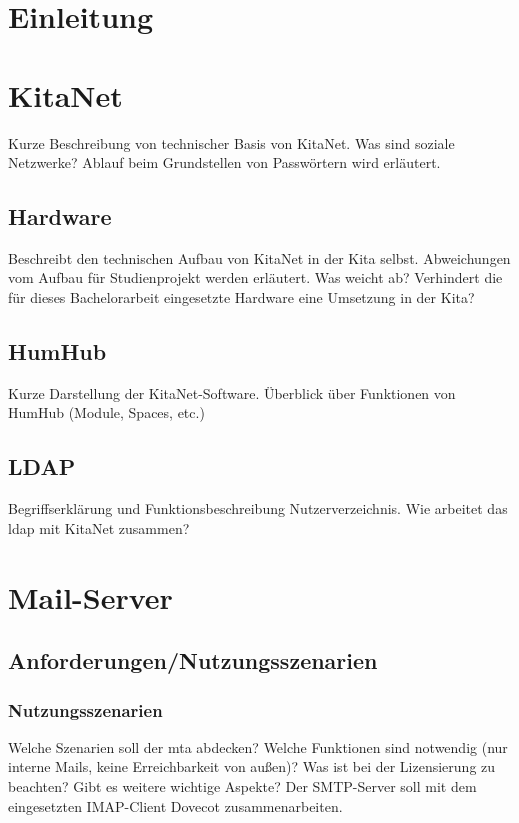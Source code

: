 

\chapter{Einleitung}
\label{sec:Einleitung}

\blindtext


\chapter{KitaNet}

Kurze Beschreibung von technischer Basis von KitaNet. Was sind soziale Netzwerke?
Ablauf beim Grundstellen von Passwörtern wird erläutert.

\section{Hardware}
Beschreibt den technischen Aufbau von KitaNet in der Kita selbst.
Abweichungen vom Aufbau für Studienprojekt werden erläutert. Was weicht ab?
Verhindert die für dieses Bachelorarbeit eingesetzte Hardware eine Umsetzung in der Kita?

\section{HumHub}
Kurze Darstellung der KitaNet-Software. Überblick über Funktionen von HumHub (Module, Spaces, etc.)

\section{LDAP}
Begriffserklärung und Funktionsbeschreibung Nutzerverzeichnis. 
Wie arbeitet das \ac{ldap} mit KitaNet zusammen?

\chapter{Mail-Server}

\section{Anforderungen/Nutzungsszenarien}
\subsection{Nutzungsszenarien}
Welche Szenarien soll der \ac{mta} abdecken? Welche Funktionen sind notwendig (\zb nur interne Mails, keine Erreichbarkeit von außen)? Was ist bei der Lizensierung zu beachten? Gibt es weitere wichtige Aspekte? Der SMTP-Server soll mit dem eingesetzten IMAP-Client Dovecot zusammenarbeiten.
